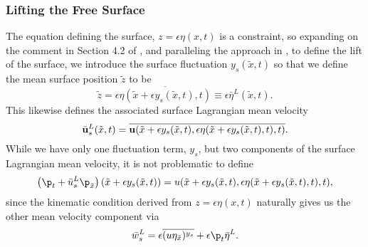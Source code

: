 \documentclass{JFM_Style/jfm}
\begin{document}
\subsubsection*{Lifting the Free Surface}
The equation defining the surface, $z=\epsilon\eta(x,t)$ is a constraint, so expanding on the comment in Section 4.2 of \cite{andrews}, and paralleling the approach in \cite{ardhuin}, to define the lift of the surface, we introduce the surface fluctuation $y_{s}(\tilde{x},t)$ so that we define the mean surface position $\tilde{z}$ to be
\[
\tilde{z} = \epsilon \overline{\eta(\tilde{x}+\epsilon y_{s}(\tilde{x},t),t)}\equiv \epsilon \bar{\eta}^{L}(\tilde{x},t).
\]
This likewise defines the associated surface Lagrangian mean velocity
\[
\bar{{\bf u}}^{L}_{s}(\tilde{x},t) = \overline{{\bf u}(\tilde{x}+\epsilon y_{s}(\tilde{x},t),\epsilon\eta(\tilde{x}+\epsilon y_{s}(\tilde{x},t),t),t)}.
\]
While we have only one fluctuation term, $y_{s}$, but two components of the surface Lagrangian mean velocity, it is not problematic to define
\[
\left(\p_{t} +\bar{u}^{L}_{s}\p_{\tilde x}\right)(\tilde{x}+\epsilon y_{s}(\tilde{x},t) )= u(\tilde{x}+\epsilon y_{s}(\tilde{x},t),\epsilon\eta(\tilde{x}+\epsilon y_{s}(\tilde{x},t),t),t),
\]
since the kinematic condition derived from $z=\epsilon \eta(x,t)$ naturally gives us the other mean velocity component via
\[
\bar{w}^{L}_{s} = \epsilon \overline{(u\eta_{\tilde{x}})^{y_{s}}} + \epsilon \p_{t}\bar{\eta}^{L}.
\]
\end{document}
